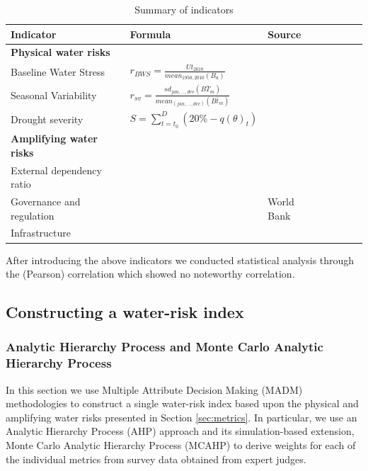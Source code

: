 \documentclass[a4paper]{article}
\begin{document}
\begin{table}[t]
\centering
\caption{Summary of indicators}
\label{tab:inv_regression} 
\resizebox{10cm}{!} {
\begin{tabular} { l l l l l l l } 
\toprule
Indicator & Formula & Source \\
\midrule
\textbf{Physical water risks} & & \\
Baseline Water Stress & $r_{BWS}=\frac{Ut_{2010}}{\mathit{mean}_{1950,2010}(B_a)}$ & \citet{Gassert:2014} \\
Seasonal Variability & $r_{sv}=\frac{\mathit{sd}_{jan,\dots,dec}(\bar{BT_m})}{\mathit{mean}_{(jan,\dots,dec)}(\bar{Bt_m})}$ & \citet{Gassert:2014} \\
Drought severity & $S= \sum_{t=t_0}^{D} (20\%-q(\theta)_t)$ & \citet{Gassert:2014} \\
\textbf{Amplifying water risks} && \\
External dependency ratio & & \citet{FAO:2016}\\
Governance and regulation & & World Bank \\
Infrastructure & & \citet{Diop:2002}\\
\bottomrule                                                                                                                                                 
\end{tabular}
}
\end{table}
After introducing the above indicators we conducted statistical analysis through the (Pearson) correlation which showed no noteworthy correlation.


\subsection{Constructing a water-risk index}
\subsubsection{Analytic Hierarchy Process and Monte Carlo Analytic Hierarchy Process}
In this section we use Multiple Attribute Decision Making (MADM) methodologies to construct a single water-risk index based upon the physical and amplifying water risks presented in Section \ref{sec:metrics}.
In particular, we use an Analytic Hierarchy Process (AHP) approach and its simulation-based extension, Monte Carlo Analytic Hierarchy Process (MCAHP) to derive weights for each of the individual metrics from survey data obtained from expert judges.
\end{document}
